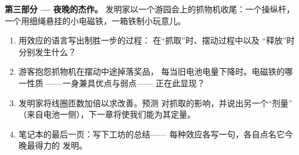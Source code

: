\begin{problem}
\medskip\noindent\textbf{第三部分 --- 夜晚的杰作。}
发明家以一个游园会上的抓物机收尾：一个操纵杆，
一个用细绳悬挂的小电磁铁，一箱铁制小玩意儿。
\begin{enumerate}[resume]
  \item 用效应的语言写出制胜一步的过程：
        在“抓取”时、摆动过程中以及
        “释放”时分别发生什么？
  \item 游客抱怨抓物机在摆动中途掉落奖品，
        每当旧电池电量下降时。电磁铁的哪一性质
        ——一身兼具优点与弱点——
        正在此显现？
  \item 发明家将线圈匝数加倍以求改善。预测
        对抓取的影响，并说出另一个“剂量”
        （来自电池一侧），下一章将使我们能为其定量。
  \item 笔记本的最后一页：写下工坊的总结——
        每种效应各写一句，各自点名它今晚最得力的
        发明。
\end{enumerate}
\end{problem}
